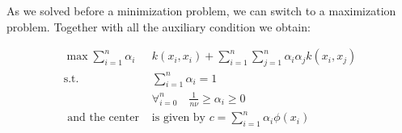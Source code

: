 As we solved before a minimization problem, we can switch to a maximization problem.
Together with all the auxiliary condition we obtain:

\begin{align}
    \label{eq:}
    \max  \sum_{i=1}^n \alpha_i & k(x_i, x_i) + \sum_{i=1}^n \sum_{j=1}^n \alpha_i \alpha_j k(x_i, x_j) \\
     \textrm{s.t. } & \sum_{i=1}^n \alpha_i = 1 \\
                    & \forall_{i=0}^n \quad \frac{1}{n \nu} \ge  \alpha_i \ge 0\\
     \textrm{ and the center }&\textrm{is given by } c = \sum_{i=1}^n \alpha_i \phi(x_i)
\end{align}
